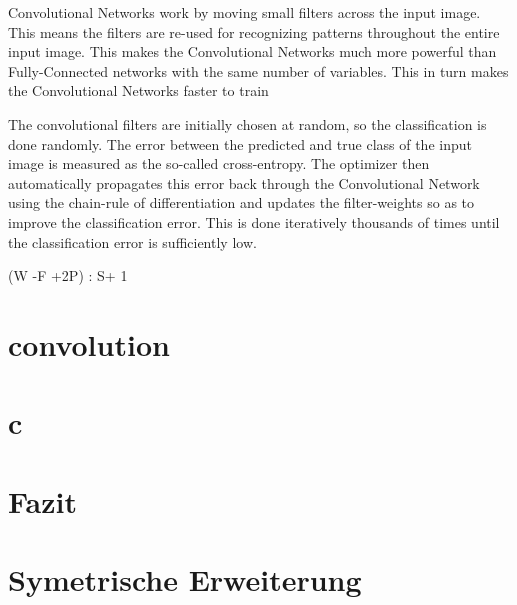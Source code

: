 Convolutional Networks work by moving small filters across the input image. This means the filters are re-used for recognizing patterns throughout the entire input image. This makes the Convolutional Networks much more powerful than Fully-Connected networks with the same number of variables. This in turn makes the Convolutional Networks faster to train




The convolutional filters are initially chosen at random, so the classification is done randomly. The error between the predicted and true class of the input image is measured as the so-called cross-entropy. The optimizer then automatically propagates this error back through the Convolutional Network using the chain-rule of differentiation and updates the filter-weights so as to improve the classification error. This is done iteratively thousands of times until the classification error is sufficiently low.


(W -F +2P) : S+ 1

\section{convolution}


\section{c}


\section{Fazit}


\section{Symetrische Erweiterung}